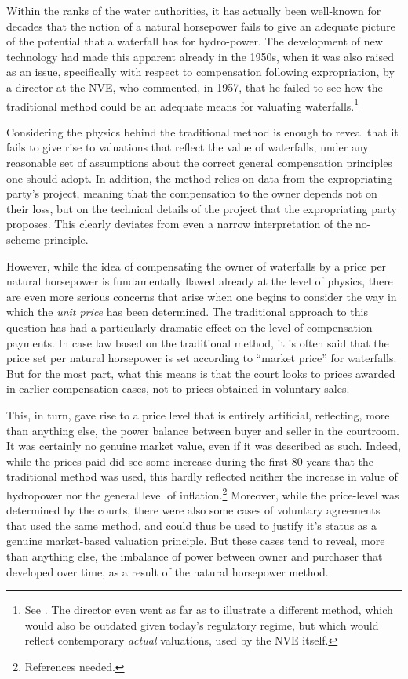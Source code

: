 Within the ranks of the water authorities, it has actually been well-known for decades that the notion of a natural horsepower fails to give an adequate picture of the potential that a waterfall has for hydro-power. The development of new technology had made this apparent already in the 1950s, when it was also raised as an issue, specifically with respect to compensation following expropriation, by a director at the NVE, who commented, in 1957, that he failed to see how the traditional method could be an adequate means for valuating waterfalls.\footnote{See \cite{....}. The director even went as far as to illustrate a different method, which would also be outdated given today's regulatory regime, but which would reflect contemporary \emph{actual} valuations, used by the NVE itself.}

Considering the physics behind the traditional method is enough to reveal that it fails to give rise to valuations that reflect the value of waterfalls, under any reasonable set of assumptions about the correct general compensation principles one should adopt. In addition, the method relies on data from the expropriating party's project, meaning that the compensation to the owner depends not on their loss, but on the technical details of the project that the expropriating party proposes. This clearly deviates from even a narrow interpretation of the no-scheme principle. 

However, while the idea of compensating the owner of waterfalls by a price per natural horsepower is fundamentally flawed already at the level of physics, there are even more serious concerns that arise when one begins to consider the way in which the \emph{unit price} has been determined. The traditional approach to this question has had a particularly dramatic effect on the level of compensation payments. In case law based on the traditional method, it is often said that the price set per natural horsepower is set according to ``market price'' for waterfalls. But for the most part, what this means is that the court looks to prices awarded in earlier compensation cases, not to prices obtained in voluntary sales.

This, in turn, gave rise to a price level that is entirely artificial, reflecting, more than anything else, the power balance between buyer and seller in the courtroom. It was certainly no genuine market value, even if it was described as such. Indeed, while the prices paid did see some increase during the first 80 years that the traditional method was used, this hardly reflected neither the increase in value of hydropower nor the general level of inflation.\footnote{References needed.} Moreover, while the price-level was determined by the courts, there were also some cases of voluntary agreements that used the same method, and could thus be used to justify it's status as a genuine market-based valuation principle. But these cases tend to reveal, more than anything else, the imbalance of power between owner and purchaser that developed over time, as a result of the natural horsepower method.

